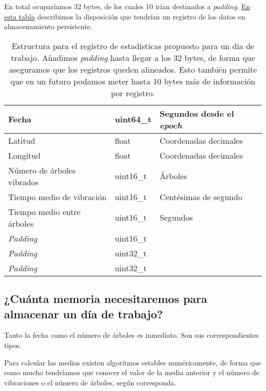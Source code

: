 En total ocuparíamos 32 bytes, de los cuales 10 irían destinados a \textit{padding}.
\hyperref[table:almacenamiento]{En esta tabla} describimos la disposición que tendrían un registro
de los datos en almacenamiento persistente.

\begin{table}[H]
    \centering
    \begin{tabular}{|l|l|l|}
        \hline
        Fecha                        & uint64\_t & Segundos desde el \textit{epoch} \\ \hline
        Latitud                      & float & Coordenadas decimales \\ \hline
        Longitud                     & float & Coordenadas decimales \\ \hline
        Número de árboles vibrados   & uint16\_t & Árboles \\ \hline
        Tiempo medio de vibración    & uint16\_t & Centésimas de segundo \\ \hline
        Tiempo medio entre árboles   & uint16\_t & Segundos \\ \hline
        \textit{Padding}             & uint16\_t &  \\ \hline
        \textit{Padding}             & uint32\_t &  \\ \hline
        \textit{Padding}             & uint32\_t &  \\ \hline
    \end{tabular}
    \caption{Estructura para el registro de estadísticas propuesto para un día de trabajo.
    Añadimos \textit{padding} hasta llegar a los 32 bytes, de forma que aseguramos que los
    registros queden alineados. Esto también permite que en un futuro
    podamos meter hasta 10 bytes más de información por registro.}
    \label{table:almacenamiento}
\end{table}

\subsection{¿Cuánta memoria necesitaremos para almacenar un día de trabajo?}

Tanto la fecha como el número de árboles es inmediato. Son sus correspondientes tipos.

Para calcular las medias existen algoritmos estables numéricamente, de forma que como mucho
tendríamos que conocer el valor de la media anterior y el número de vibraciones o el número
de árboles, según corresponda.

